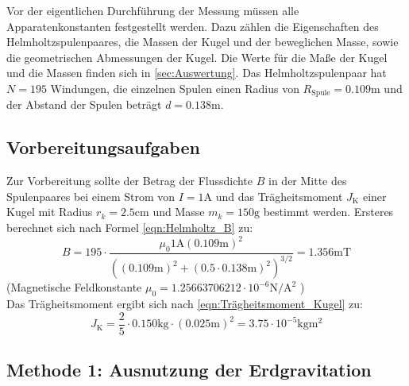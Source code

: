 Vor der eigentlichen Durchführung der Messung müssen alle Apparatenkonstanten festgestellt werden. Dazu zählen die Eigenschaften des Helmholtzspulenpaares, die Massen der 
Kugel und der beweglichen Masse, sowie die geometrischen Abmessungen der Kugel. Die Werte für die Maße der Kugel und die Massen finden sich in \autoref{sec:Auswertung}.
Das Helmholtzspulenpaar hat $N = 195$ Windungen, die einzelnen Spulen einen Radius von $R_{\text{Spule}} = 0.109\unit{\metre}$ und der Abstand der Spulen beträgt
$d = 0.138\unit{\meter}$.

\subsection{Vorbereitungsaufgaben}
\label{subsec:Vorbereitungsaufgaben}

Zur Vorbereitung sollte der Betrag der Flussdichte $B$ in der Mitte des Spulenpaares bei einem Strom von $I = 1\unit{\ampere}$ und das Trägheitsmoment $J_{\text{K}}$
einer Kugel mit Radius $r_k = 2.5\unit{\centi\metre}$ und Masse $m_k = 150\unit{\gram}$ bestimmt werden.
Ersteres berechnet sich nach Formel \eqref{eqn:Helmholtz_B} zu:
\begin{equation*}
    B = 195 \cdot \frac{\mu_0 1\unit{\ampere}(0.109\unit{\metre})^2}{((0.109\unit{\metre})^2 + (0.5 \cdot 0.138\unit{\meter})^2)^{3/2}} = 1.356 \unit{\milli\tesla}
\end{equation*}
(Magnetische Feldkonstante $\mu_0 = 1.25663706212 \cdot 10^{-6} \unit{\newton\per\ampere\squared}$ \cite{scipy}) \\
Das Trägheitsmoment ergibt sich nach \eqref{eqn:Trägheitsmoment_Kugel} zu:
\begin{equation*}
    J_{\text{K}} = \frac{2}{5} \cdot 0.150\unit{\kilogram} \cdot (0.025\unit{\metre})^2 = 3.75 \cdot 10^{-5} \unit{\kilogram\metre\squared} 
\end{equation*}

\subsection{Methode 1: Ausnutzung der Erdgravitation}
\label{subsec:Methode1}

